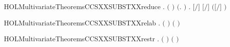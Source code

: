 \begin{SaveVerbatim}{HOLMultivariateTheoremsCCSXXSUBSTXXreduce}
\HOLTokenTurnstile{} \HOLSymConst{\HOLTokenForall{}}   .
       \HOLSymConst{\HOLTokenNeg{}}   \HOLSymConst{\HOLTokenConj{}}   \HOLSymConst{\HOLTokenConj{}} \ensuremath{(}  \HOLSymConst{\ensuremath{=}}  \ensuremath{)} \HOLSymConst{\HOLTokenConj{}}
        \ensuremath{(}\HOLTokenLambda{}.  \HOLConst{\HOLTokenNotIn{}}  \ensuremath{)}  \HOLSymConst{\HOLTokenImp{}}
       \HOLSymConst{\HOLTokenForall{}}. \ensuremath{[}\HOLSymConst{::}\ensuremath{/}\HOLSymConst{::}\ensuremath{]}  \HOLSymConst{\ensuremath{=}} \ensuremath{[}\ensuremath{/}\ensuremath{]} \ensuremath{(}\ensuremath{[}\ensuremath{/}\ensuremath{]} \ensuremath{)}
\end{SaveVerbatim}
\newcommand{\HOLMultivariateTheoremsCCSXXSUBSTXXreduce}{\UseVerbatim{HOLMultivariateTheoremsCCSXXSUBSTXXreduce}}
\begin{SaveVerbatim}{HOLMultivariateTheoremsCCSXXSUBSTXXrelab}
\HOLTokenTurnstile{} \HOLSymConst{\HOLTokenForall{}}  .
         \ensuremath{(}  \ensuremath{)} \HOLSymConst{\ensuremath{=}}  \ensuremath{(}  \ensuremath{)} 
\end{SaveVerbatim}
\newcommand{\HOLMultivariateTheoremsCCSXXSUBSTXXrelab}{\UseVerbatim{HOLMultivariateTheoremsCCSXXSUBSTXXrelab}}
\begin{SaveVerbatim}{HOLMultivariateTheoremsCCSXXSUBSTXXrestr}
\HOLTokenTurnstile{} \HOLSymConst{\HOLTokenForall{}}  .   \ensuremath{(}  \ensuremath{)} \HOLSymConst{\ensuremath{=}}   \ensuremath{(}  \ensuremath{)}
\end{SaveVerbatim}
\newcommand{\HOLMultivariateTheoremsCCSXXSUBSTXXrestr}{\UseVerbatim{HOLMultivariateTheoremsCCSXXSUBSTXXrestr}}
